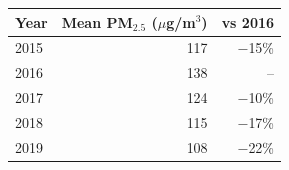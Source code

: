 \begin{tabular}{|l|r|r|}
\hline
\textbf{Year} & \textbf{Mean PM$_{2.5}$ ($\mu$g/m$^3$)} & \textbf{vs 2016} \\\hline
2015 & 117 & \ensuremath{-}15\% \\\hline
2016 & 138 & -- \\\hline
2017 & 124 & \ensuremath{-}10\% \\\hline
2018 & 115 & \ensuremath{-}17\% \\\hline
2019 & 108 & \ensuremath{-}22\% \\\hline
\end{tabular}
